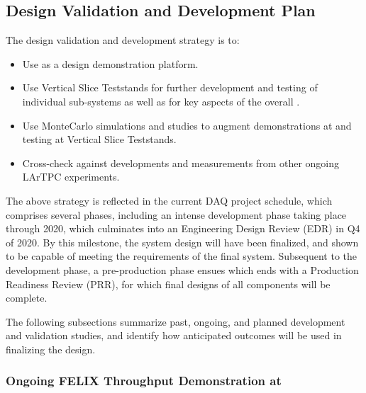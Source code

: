 \subsection{Design Validation and Development Plan}
\label{sec:sp-daq:design-validation}

The    design validation and development strategy is to:
\begin{itemize}
\item Use  as a design demonstration platform. 
\item Use Vertical Slice Teststands for further development and testing of
  individual  sub-systems as well as for key aspects of the
  overall . 
\item Use  MonteCarlo simulations and studies to augment
  demonstrations at  and testing at Vertical Slice Teststands.
\item Cross-check against developments and measurements from other ongoing
  LArTPC experiments.
\end{itemize}

The above strategy is reflected in the current DAQ project schedule, which
comprises several phases, including an intense development phase
taking place through 2020, which culminates into an Engineering Design
Review (EDR) in Q4 of 2020. By this milestone, the system design will have been
finalized, and shown to be capable of meeting the requirements of the
final  system. Subsequent to the development phase, a
pre-production phase ensues which ends with a Production Readiness
Review (PRR), for which final designs of all components
will be complete.

The following subsections summarize past, ongoing, and planned
development and validation studies, and identify how anticipated outcomes
will be used in finalizing the  design.

\subsubsection{Ongoing FELIX Throughput Demonstration at }
\label{sec:sp-daq:validation-pdune-felix}



